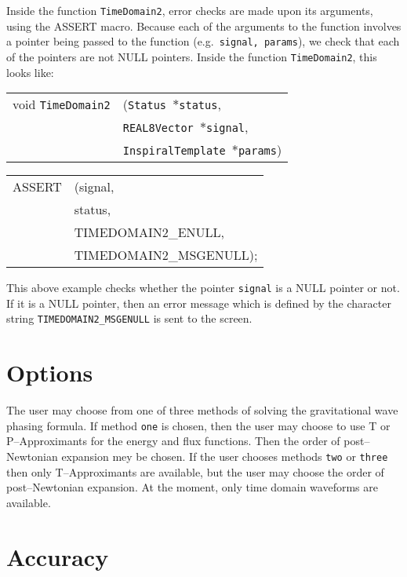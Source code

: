 \documentclass[12pt]{article}
\begin{document}
Inside the function \texttt{TimeDomain2}, error checks are made upon its arguments, using the ASSERT macro. Because each of the arguments to the function involves a pointer being passed to the function (e.g.\ \texttt{signal, params}), we check that each of the pointers are not NULL pointers.
Inside the function \texttt{TimeDomain2}, this looks like:

\vspace{5mm}

\begin{tabular}{ll}
void \texttt{TimeDomain2}&(\texttt{Status $\ast$status},     \\
                                   &\texttt{REAL8Vector $\ast$signal}, \\
                                   &\texttt{InspiralTemplate $\ast$params})
\end{tabular}

\vspace{5mm}

\begin{tabular}{ll}
ASSERT & (signal,  \\
       &  status,    \\
       &  TIMEDOMAIN2\_ENULL, \\
       &  TIMEDOMAIN2\_MSGENULL);
\end{tabular}

\vspace{5mm}

This above example checks whether the pointer \texttt{signal} is a NULL pointer or not. If it is a NULL pointer, then an error message which is defined by the character string \texttt{TIMEDOMAIN2\_MSGENULL} is sent to the screen.


\section{Options}

The user may choose from one of three methods of solving the gravitational wave phasing formula. If method \texttt{one} is chosen, then the user may choose to use T or P--Approximants for the energy and flux functions. Then the order of post--Newtonian expansion mey be chosen. If the user chooses methods \texttt{two} or \texttt{three} then only T--Approximants are available, but the user may choose the order of post--Newtonian expansion. At the moment, only time domain waveforms are available.

\section{Accuracy}
\end{document}
